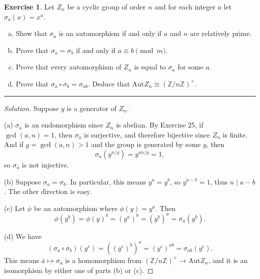 \documentclass{article}
\theoremstyle{definition}
\newtheorem{exercise}{Exercise}
\begin{document}
\pagebreak

\begin{exercise}
  Let $Z_n$ be a cyclic group of order $n$ and for each integer $a$ let $\sigma_a(x) = x^a$.
  \begin{enumerate}[(a)]
    \item Show that $\sigma_a$ is an automorphism if and only if $a$ and $n$ are relatively prime.
    \item Prove that $\sigma_a = \sigma_b$ if and only if $a\equiv b\pmod m$.
    \item Prove that every automorphism of $Z_n$ is equal to $\sigma_a$ for some $a$.
    \item Prove that $\sigma_a\circ\sigma_b=\sigma_{ab}$. Deduce that $\mathrm{Aut} Z_n \cong (\mathbb{Z}/n\mathbb{Z})^\times$.
  \end{enumerate}
\end{exercise}
\hrule
\begin{proof}[Solution]
  Suppose $y$ is a generator of $Z_n$.

  (a) $\sigma_a$ is an endomorphism since $Z_n$ is abelian. By Exercise 25, if $\gcd(a,n) = 1$, then $\sigma_a$ is surjective, and therefore bijective since $Z_n$ is finite. And if $g = \gcd(a,n) > 1$ and the group is generated by some $y$, then
  $$\sigma_a(y^{n/g}) = y^{an/g} = 1,$$
  so $\sigma_a$ is not injective.

  \vspace{0.5em}
  (b) Suppose $\sigma_a = \sigma_b$. In particular, this means $y^a = y^b$, so $y^{a-b} = 1$, thus $n\mid a-b$. The other direction is easy.

  \vspace{0.5em}
  (c) Let $\phi$ be an automorphism where $\phi(y) = y^a$. Then
  $$\phi(y^b) = \phi(y)^b = (y^a)^b = (y^b)^a = \sigma_a(y^b).$$

  \vspace{0.5em}
  (d) We have
  $$(\sigma_a\circ\sigma_b)(y^c) = ((y^c)^b)^a = (y^c)^{ab} = \sigma_{ab}(y^c).$$
  This means $\bar{a}\mapsto\sigma_a$ is a homomorphism from $(\mathbb{Z}/n\mathbb{Z})^\times\to \mathrm{Aut}Z_n$, and it is an isomorphism by either one of parts (b) or (c).
\end{proof}

\pagebreak
\end{document}
